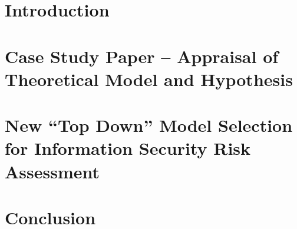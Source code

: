 \documentclass[harvard]{lincolncsthesis}
\begin{document}
\maketitle



\thesisTables
\thesisBodyStart

\chapter{Introduction}


\chapter{Case Study Paper – Appraisal of Theoretical Model and Hypothesis}


\chapter{New ``Top Down'' Model Selection for Information Security Risk Assessment}


\chapter{Conclusion}


\printReferences
\end{document}
